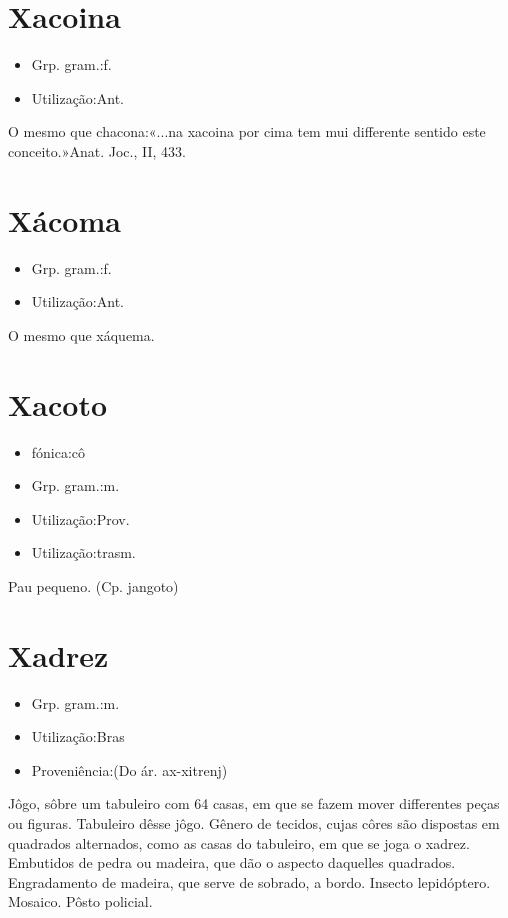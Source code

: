 \section{Xacoina}
\begin{itemize}
\item {Grp. gram.:f.}
\end{itemize}
\begin{itemize}
\item {Utilização:Ant.}
\end{itemize}
O mesmo que \textunderscore chacona\textunderscore :«\textunderscore ...na xacoina por cima tem mui differente sentido este conceito.\textunderscore »\textunderscore Anat. Joc.\textunderscore , II, 433.
\section{Xácoma}
\begin{itemize}
\item {Grp. gram.:f.}
\end{itemize}
\begin{itemize}
\item {Utilização:Ant.}
\end{itemize}
O mesmo que \textunderscore xáquema\textunderscore .
\section{Xacoto}
\begin{itemize}
\item {fónica:cô}
\end{itemize}
\begin{itemize}
\item {Grp. gram.:m.}
\end{itemize}
\begin{itemize}
\item {Utilização:Prov.}
\end{itemize}
\begin{itemize}
\item {Utilização:trasm.}
\end{itemize}
Pau pequeno.
(Cp. \textunderscore jangoto\textunderscore )
\section{Xadrez}
\begin{itemize}
\item {Grp. gram.:m.}
\end{itemize}
\begin{itemize}
\item {Utilização:Bras}
\end{itemize}
\begin{itemize}
\item {Proveniência:(Do ár. \textunderscore ax-xitrenj\textunderscore )}
\end{itemize}
Jôgo, sôbre um tabuleiro com 64 casas, em que se fazem mover differentes peças ou figuras.
Tabuleiro dêsse jôgo.
Gênero de tecidos, cujas côres são dispostas em quadrados alternados, como as casas do tabuleiro, em que se joga o xadrez.
Embutidos de pedra ou madeira, que dão o aspecto daquelles quadrados.
Engradamento de madeira, que serve de sobrado, a bordo.
Insecto lepidóptero.
Mosaico.
Pôsto policial.
